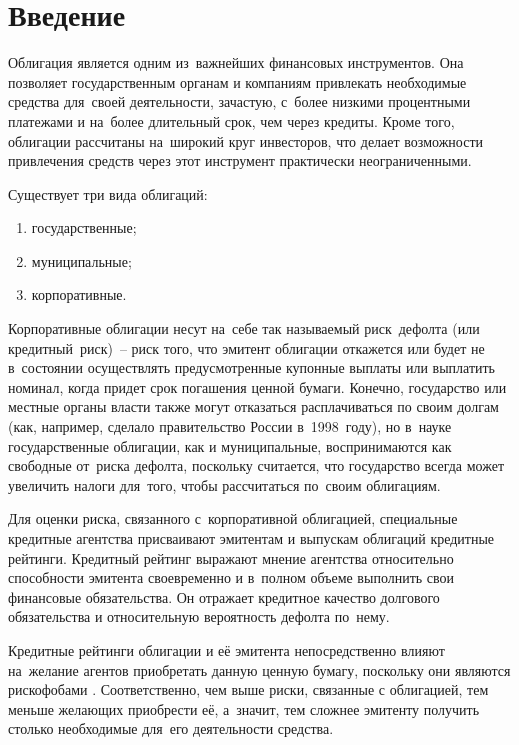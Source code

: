 \chapter*{Введение}



Облигация является одним из~важнейших финансовых инструментов. Она позволяет государственным органам и компаниям привлекать необходимые средства для~своей деятельности, зачастую, с~более низкими процентными платежами и на~более длительный срок, чем через кредиты. Кроме того, облигации рассчитаны на~широкий круг инвесторов, что делает возможности привлечения средств через этот инструмент практически неограниченными.

Существует три вида облигаций: 
\begin{enumerate}
	\item государственные;
	\item муниципальные;
	\item корпоративные.
\end{enumerate}
Корпоративные облигации несут на~себе так называемый риск~дефолта (или кредитный~риск)~– риск того, что эмитент облигации  откажется или будет не в~состоянии осуществлять предусмотренные купонные выплаты или выплатить номинал, когда придет срок погашения ценной бумаги. Конечно, государство или местные органы власти также могут отказаться расплачиваться по своим долгам (как, например, сделало правительство России в~1998~году), но в~науке государственные облигации, как и муниципальные, воспринимаются как свободные от~риска дефолта, поскольку считается, что государство всегда может увеличить налоги для~того, чтобы рассчитаться по~своим облигациям.

Для оценки риска, связанного с~корпоративной облигацией, специальные кредитные агентства присваивают эмитентам и выпускам облигаций кредитные рейтинги. Кредитный рейтинг выражают мнение агентства относительно способности эмитента своевременно и в~полном объеме выполнить свои финансовые обязательства. Он отражает кредитное качество долгового обязательства и относительную вероятность дефолта по~нему.

Кредитные рейтинги облигации и её эмитента непосредственно влияют на~желание агентов приобретать данную ценную бумагу, поскольку они являются рискофобами . Соответственно, чем выше риски, связанные с облигацией, тем меньше желающих приобрести её, а~значит, тем сложнее эмитенту получить столько необходимые для~его деятельности средства.

